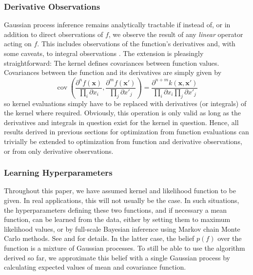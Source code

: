 \documentclass[twoside,11pt]{article}
\newcommand{\de}{\partial}
\newcommand{\vx}{\vec{x}}
\renewcommand{\vec}{\boldsymbol}
\begin{document}
\subsubsection{Derivative Observations}
\label{sec:deriv-observ}
Gaussian process inference remains analytically tractable if instead
of, or in addition to direct observations of $f$, we observe the
result of any \emph{linear} operator acting on $f$. This includes
observations of the function's derivatives \citep[][]{RasmussenWilliams} and, with some caveats, to integral
observations \citep{minka2000deriving}. The extension is pleasingly
straightforward: The kernel defines covariances between function
values. Covariances between the function and its derivatives are
simply given by
\begin{equation}
  \label{eq:9}
  \operatorname{cov}\left(\frac{\de^n f(\vx)}{\prod_i \de x_i} , \frac{\de^m
      f(\vx')}{\prod_j \de x' _j}\right) = \frac{\de^{n+m}
    k(\vx,\vx')}{\prod_i \de x_i \prod_j \de x' _j}
\end{equation}
so kernel evaluations simply have to be replaced with derivatives (or
integrals) of the kernel where required. Obviously, this operation is
only valid as long as the derivatives and integrals in question exist
for the kernel in question. Hence, all results derived in previous
sections for optimization from function evaluations can trivially be
extended to optimization from function and derivative observations, or
from only derivative observations. 

\subsubsection{Learning Hyperparameters}
\label{sec:learn-hyperp}

Throughout this paper, we have assumed kernel and likelihood function
to be given. In real applications, this will not usually be the
case. In such situations, the hyperparameters defining these two
functions, and if necessary a mean function, can be learned from the
data, either by setting them to maximum likelihood values, or by
full-scale Bayesian inference using Markov chain Monte Carlo
methods. See \citet[][]{RasmussenWilliams} and
\citet{murray2010slice} for details. In the latter case, the belief
$p(f)$ over the function is a mixture of Gaussian processes. To still
be able to use the algorithm derived so far, we approximate this
belief with a single Gaussian process by calculating expected values
of mean and covariance function.
\end{document}
